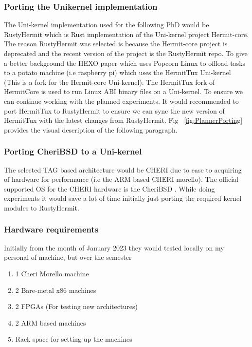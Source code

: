 \subsubsection{Porting the Unikernel implementation}
The Uni-kernel implementation used for the following PhD would be RustyHermit 
which is Rust implementation of the Uni-kernel project Hermit-core. The reason 
RustyHermit was selected is because the Hermit-core project is deprecated and 
the recent version of the project is the RustyHermit repo. To give a better 
background the HEXO paper \cite{HEXO} which uses Popcorn Linux to offload 
tasks to a potato machine (i.e raspberry pi) which uses the HermitTux Uni-kernel (This 
is a fork for the Hermit-core Uni-kernel). The HermitTux fork of HermitCore is used to 
run Linux ABI binary files on a Uni-kernel. To ensure we can continue working with the
planned experiments. It would recommended to port HermitTux to RustyHermit to ensure we 
can sync the new version of HermitTux with the latest changes from RustyHermit. Fig ~\ref{fig:PlannerPorting}
 provides the visual description of the following paragraph. 

\subsubsection{Porting CheriBSD to a Uni-kernel}
The selected TAG based architecture would be CHERI due to ease to acquiring of hardware 
for performance (i.e the ARM based CHERI morello). The official supported OS for 
the CHERI hardware is the CheriBSD \cite{CHERIBSD}. While doing experiments it 
would save a lot of time initially just porting the required kernel modules to 
RustyHermit.

\subsubsection{Hardware requirements}
Initially from the month of January 2023 they would tested locally on 
my personal of machine, but over the semester 
\begin{enumerate}
  \item 1 Cheri Morello machine 
  \item 2 Bare-metal x86 machines
  \item 2 FPGAs (For testing new architectures)
  \item 2 ARM based machines
  \item Rack space for setting up the machines 
\end{enumerate}


